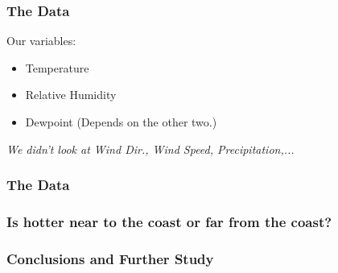 \documentclass{beamer}
\begin{document}
\begin{frame}
\frametitle{The Data}
Our variables:
\begin{itemize}
\item Temperature
\item Relative Humidity
\item Dewpoint (Depends on the other two.)
\end{itemize}
\textit{We didn't look at Wind Dir., Wind Speed, Precipitation,...}
\end{frame}




\begin{frame}
\frametitle{The Data}
\end{frame}


\begin{frame}
\frametitle{Is hotter near to the coast or far from the coast?}
\end{frame}




\begin{frame}
\frametitle{Conclusions and Further Study}
\end{frame}
\end{document}
